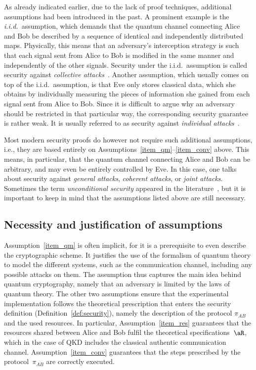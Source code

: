 As already indicated earlier, due to the lack of proof techniques, additional assumptions had been introduced in the past. A prominent example is the \emph{i.i.d.}\ assumption, which demands that the quantum channel connecting Alice and Bob be described by a sequence of identical and independently distributed maps. Physically, this means that an adversary's interception strategy is such that each signal sent from Alice to Bob is modified in the same manner and independently of the other signals. Security under the i.i.d.\ assumption is called security against \emph{collective attacks}~\cite[see also ]{BM97b,BBBvdGM02}. Another assumption, which  usually comes on top of the i.i.d.\ assumption, is that Eve only stores classical data, which she obtains by individually measuring the pieces of information she gained from each signal sent from Alice to Bob. Since it is difficult to argue why an adversary should be restricted in that particular way, the corresponding security guarantee is rather weak. It is usually referred to as security against \emph{individual attacks}~\cite[see ]{Fuchsetal1997,Lutkenhaus2000}. 

Most modern security proofs do however not require such additional assumptions, i.e., they are based entirely on Assumptions~\ref{item_qm}--\ref{item_conv} above. This means, in particular, that the quantum channel connecting Alice and Bob can be arbitrary, and may even be entirely controlled by Eve. In this case, one talks about security against \emph{general attacks}, \emph{coherent attacks}, or \emph{joint attacks}. Sometimes the term  \emph{unconditional security} appeared in the literature~\cite{SBCDLP09}, but it is important to keep in mind that the assumptions listed above are still necessary.

\subsection{Necessity and justification of assumptions} \label{sec:attacks:necessity}

Assumption~\ref{item_qm} is often implicit, for it is a prerequisite to even describe the cryptographic scheme. It justifies the use of the formalism of quantum theory to model the different systems, such as the communication channel, including any possible attacks on them. The assumption thus captures the main idea behind quantum cryptography, namely that an adversary is limited by the laws of quantum theory.  The other two assumptions ensure that the experimental implementation follows the theoretical prescription that enters the security definition (Definition~\ref{def:security}), namely the description of the protocol $\pi_{AB}$ and the used resources. In particular, Assumption~\ref{item_res} guarantees that the resources shared between Alice and Bob fulfil the theoretical specifications~$\aR$, which in the case of QKD includes the classical authentic communication channel. Assumption~\ref{item_conv} guarantees that the steps prescribed by the protocol~$\pi_{A B}$ are correctly executed.

